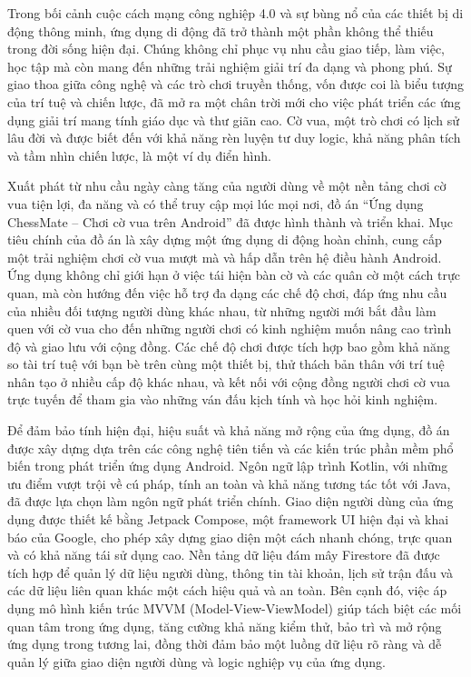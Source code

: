 \documentclass[a4paper,12pt]{article}
\begin{document}
\onehalfspacing
\justify
\noindent Trong bối cảnh cuộc cách mạng công nghiệp 4.0 và sự bùng nổ của các thiết bị di động thông minh, ứng dụng di động đã trở thành một phần không thể thiếu trong đời sống hiện đại. Chúng không chỉ phục vụ nhu cầu giao tiếp, làm việc, học tập mà còn mang đến những trải nghiệm giải trí đa dạng và phong phú. Sự giao thoa giữa công nghệ và các trò chơi truyền thống, vốn được coi là biểu tượng của trí tuệ và chiến lược, đã mở ra một chân trời mới cho việc phát triển các ứng dụng giải trí mang tính giáo dục và thư giãn cao. Cờ vua, một trò chơi có lịch sử lâu đời và được biết đến với khả năng rèn luyện tư duy logic, khả năng phân tích và tầm nhìn chiến lược, là một ví dụ điển hình.

\noindent Xuất phát từ nhu cầu ngày càng tăng của người dùng về một nền tảng chơi cờ vua tiện lợi, đa năng và có thể truy cập mọi lúc mọi nơi, đồ án “Ứng dụng ChessMate – Chơi cờ vua trên Android” đã được hình thành và triển khai. Mục tiêu chính của đồ án là xây dựng một ứng dụng di động hoàn chỉnh, cung cấp một trải nghiệm chơi cờ vua mượt mà và hấp dẫn trên hệ điều hành Android. Ứng dụng không chỉ giới hạn ở việc tái hiện bàn cờ và các quân cờ một cách trực quan, mà còn hướng đến việc hỗ trợ đa dạng các chế độ chơi, đáp ứng nhu cầu của nhiều đối tượng người dùng khác nhau, từ những người mới bắt đầu làm quen với cờ vua cho đến những người chơi có kinh nghiệm muốn nâng cao trình độ và giao lưu với cộng đồng. Các chế độ chơi được tích hợp bao gồm khả năng so tài trí tuệ với bạn bè trên cùng một thiết bị, thử thách bản thân với trí tuệ nhân tạo ở nhiều cấp độ khác nhau, và kết nối với cộng đồng người chơi cờ vua trực tuyến để tham gia vào những ván đấu kịch tính và học hỏi kinh nghiệm.

\noindent Để đảm bảo tính hiện đại, hiệu suất và khả năng mở rộng của ứng dụng, đồ án được xây dựng dựa trên các công nghệ tiên tiến và các kiến trúc phần mềm phổ biến trong phát triển ứng dụng Android. Ngôn ngữ lập trình Kotlin, với những ưu điểm vượt trội về cú pháp, tính an toàn và khả năng tương tác tốt với Java, đã được lựa chọn làm ngôn ngữ phát triển chính. Giao diện người dùng của ứng dụng được thiết kế bằng Jetpack Compose, một framework UI hiện đại và khai báo của Google, cho phép xây dựng giao diện một cách nhanh chóng, trực quan và có khả năng tái sử dụng cao. Nền tảng dữ liệu đám mây Firestore đã được tích hợp để quản lý dữ liệu người dùng, thông tin tài khoản, lịch sử trận đấu và các dữ liệu liên quan khác một cách hiệu quả và an toàn. Bên cạnh đó, việc áp dụng mô hình kiến trúc MVVM (Model-View-ViewModel) giúp tách biệt các mối quan tâm trong ứng dụng, tăng cường khả năng kiểm thử, bảo trì và mở rộng ứng dụng trong tương lai, đồng thời đảm bảo một luồng dữ liệu rõ ràng và dễ quản lý giữa giao diện người dùng và logic nghiệp vụ của ứng dụng.
\end{document}
